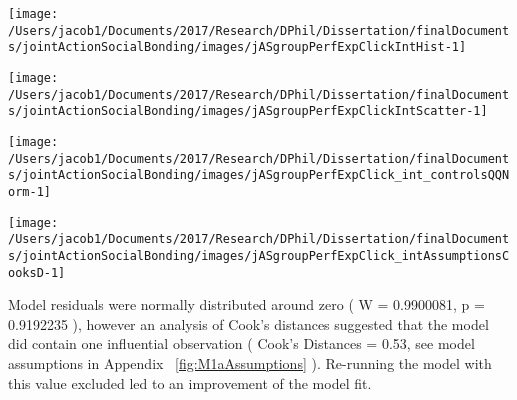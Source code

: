 \documentclass[english]{article}\usepackage[]{graphicx}\usepackage[]{color}
\makeatletter
\def\maxwidth{ %
  \ifdim\Gin@nat@width>\linewidth
    \linewidth
  \else
    \Gin@nat@width
  \fi
}
\newenvironment{knitrout}{}{} %
\newcommand{\pvalue}{p =}
\newcommand{\resdist}{W = }
\newcommand{\cooksD}{Cook's Distances}
\makeatother
\begin{document}


\begin{knitrout}
\color{fgcolor}

{\centering \texttt{[image: /Users/jacob1/Documents/2017/Research/DPhil/Dissertation/finalDocuments/jointActionSocialBonding/images/jASgroupPerfExpClickIntHist-1]} 

}



\end{knitrout}
\begin{knitrout}
\color{fgcolor}

{\centering \texttt{[image: /Users/jacob1/Documents/2017/Research/DPhil/Dissertation/finalDocuments/jointActionSocialBonding/images/jASgroupPerfExpClickIntScatter-1]} 

}



\end{knitrout}
\begin{knitrout}
\color{fgcolor}

{\centering \texttt{[image: /Users/jacob1/Documents/2017/Research/DPhil/Dissertation/finalDocuments/jointActionSocialBonding/images/jASgroupPerfExpClick\_int\_controlsQQNorm-1]} 

}



\end{knitrout}
\begin{knitrout}
\color{fgcolor}

{\centering \texttt{[image: /Users/jacob1/Documents/2017/Research/DPhil/Dissertation/finalDocuments/jointActionSocialBonding/images/jASgroupPerfExpClick\_intAssumptionsCooksD-1]} 

}



\end{knitrout}




Model residuals were normally distributed around zero
(
  \resdist
    0.9900081,
  \pvalue
    0.9192235
),
however
an analysis of Cook's distances suggested that the model did contain one influential observation
(
  \cooksD
  =
   0.53,
   see model assumptions in Appendix  ~\ref{fig:M1aAssumptions}
).
Re-running the model with this value excluded led to an improvement of the model fit.
\end{document}
